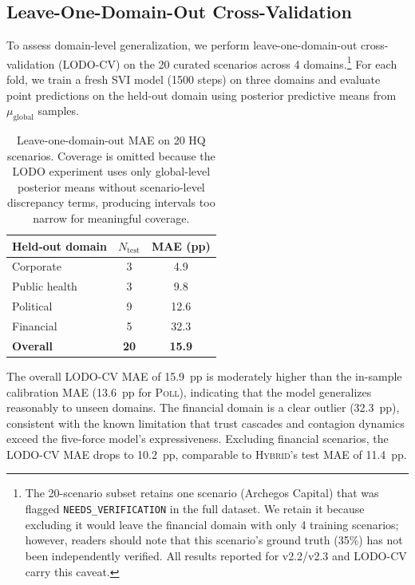 \documentclass[12pt]{article}
\begin{document}
\subsection{Leave-One-Domain-Out Cross-Validation}
\label{sec:lodocv}

To assess domain-level generalization, we perform leave-one-domain-out cross-validation (LODO-CV) on the 20 curated scenarios across 4 domains.\footnote{The 20-scenario subset retains one scenario (Archegos Capital) that was flagged \texttt{NEEDS\_VERIFICATION} in the full dataset. We retain it because excluding it would leave the financial domain with only 4 training scenarios; however, readers should note that this scenario's ground truth (35\%) has not been independently verified. All results reported for v2.2/v2.3 and LODO-CV carry this caveat.} For each fold, we train a fresh SVI model (1500 steps) on three domains and evaluate point predictions on the held-out domain using posterior predictive means from $\mu_{\text{global}}$ samples.

\begin{table}[H]
\centering
\caption{Leave-one-domain-out MAE on 20 HQ scenarios. Coverage is omitted because the LODO experiment uses only global-level posterior means without scenario-level discrepancy terms, producing intervals too narrow for meaningful coverage.}
\label{tab:lodocv}
\begin{tabular}{@{}lcc@{}}
\toprule
Held-out domain & $N_{\text{test}}$ & MAE (pp) \\
\midrule
Corporate      & 3 &  4.9 \\
Public health  & 3 &  9.8 \\
Political      & 9 & 12.6 \\
Financial      & 5 & 32.3 \\
\midrule
\textbf{Overall} & \textbf{20} & \textbf{15.9} \\
\bottomrule
\end{tabular}
\end{table}

The overall LODO-CV MAE of 15.9~pp is moderately higher than the in-sample calibration MAE (13.6~pp for \textsc{Poll}), indicating that the model generalizes reasonably to unseen domains. The financial domain is a clear outlier (32.3~pp), consistent with the known limitation that trust cascades and contagion dynamics exceed the five-force model's expressiveness. Excluding financial scenarios, the LODO-CV MAE drops to 10.2~pp, comparable to \textsc{Hybrid}'s test MAE of 11.4~pp.
\end{document}
